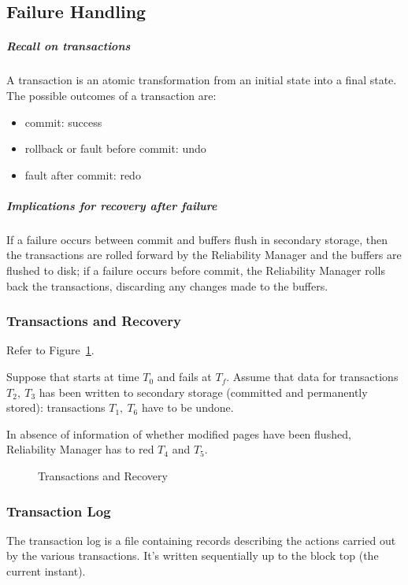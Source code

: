 \documentclass[english]{article}
\begin{document}
\subsection{Failure Handling}

\subparagraph*{Recall on transactions}
A transaction is an atomic transformation from an initial state into a final state.
The possible outcomes of a transaction are:

\begin{itemize}
  \item commit: success
  \item rollback or fault before commit: undo
  \item fault after commit: redo
\end{itemize}

\subparagraph*{Implications for recovery after failure}
If a failure occurs between commit and buffers flush in secondary storage, then the transactions are rolled forward by the Reliability Manager and the buffers are flushed to disk;
if a failure occurs before commit, the Reliability Manager rolls back the transactions, discarding any changes made to the buffers.

\subsubsection{Transactions and Recovery}

Refer to Figure~\ref{fig:transaction-recovery}.

Suppose that \dbms starts at time \(T_0\) and fails at \(T_f\).
Assume that data for transactions \(T_2,\ T_3\) has been written to secondary storage (committed and permanently stored):
transactions \(T_1,\ T_6\) have to be undone.

In absence of information of whether modified pages have been flushed, Reliability Manager has to red \(T_4\) and \(T_5\).

\begin{figure}[htbp]
  \centering
  \bigskip
  \caption{Transactions and Recovery}
  \label{fig:transaction-recovery}
  \bigskip
\end{figure}

\subsubsection{Transaction Log}

The transaction log is a file containing records describing the actions carried out by the various transactions.
It's written sequentially up to the block top (the current instant).
\end{document}
